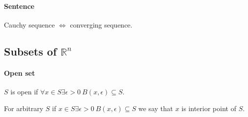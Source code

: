  \paragraph{Sentence} Cauchy sequence $\iff$ converging sequence.
 \subsection{Subsets of $\mathbb{R}^n$}
 \paragraph{Open set}
 $S$ is open if $\forall x \in S \exists \epsilon > 0 \: B(x,\epsilon) \subseteq S$.
 
 For arbitrary $S$ if $x \in S \exists \epsilon > 0 \: B(x,\epsilon) \subseteq S$ we say that $x$ is interior point of $S$.